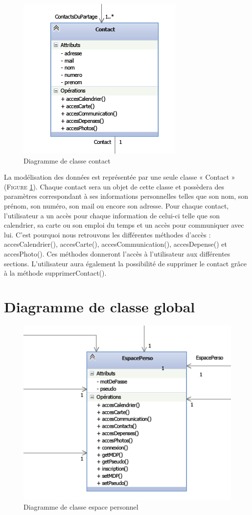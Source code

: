 \documentclass[11pt]{article}
\begin{document}
\begin{figure}[!h]
        \centering \includegraphics[scale=1]{contact.png}
        \caption{Diagramme de classe contact}
         \label{fig:contact}
\end{figure}
La modélisation des données est représentée par une seule classe « Contact »  (\textsc{Figure \ref{fig:contact}}). Chaque contact sera un objet de cette classe et possèdera des paramètres correspondant à ses informations personnelles telles que son nom, son prénom, son numéro, son mail ou encore son adresse. Pour chaque contact, l’utilisateur a un accès pour chaque information de celui-ci telle que son calendrier, sa carte ou son emploi du temps et un accès pour communiquer avec lui. C’est pourquoi nous retrouvons les différentes méthodes d’accès : accesCalendrier(), accesCarte(), accesCommunication(), accesDepense() et accesPhoto(). Ces méthodes donneront l’accès à l’utilisateur aux différentes sections. L’utilisateur aura également la possibilité de supprimer le contact grâce à la méthode supprimerContact().


\newpage
\section{Diagramme de classe global}
\begin{figure}[!h]
        \centering \includegraphics[scale=2]{espace.png}
        \caption{Diagramme de classe espace personnel}
         \label{fig:espace}
\end{figure}
\end{document}
